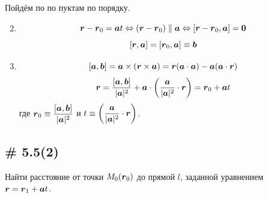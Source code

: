 \documentclass[a4paper,12pt]{article}
\begin{document}
  \begin{solution}
    Пойдём по по пуктам по порядку.
    
    \begin{enumerate}
      \setcounter{enumi}{1}
      
      \item
        \[
          \boldsymbol r - \boldsymbol r_0 = \boldsymbol a t
          \Leftrightarrow (\boldsymbol r - \boldsymbol r_0) \parallel \boldsymbol a
          \Leftrightarrow [\boldsymbol r - \boldsymbol r_0, \boldsymbol a] = \boldsymbol 0
        \]
        \[
          [\boldsymbol r, \boldsymbol a] = [\boldsymbol r_0, \boldsymbol a] \equiv \boldsymbol b
        \]
      
      \item
        \[
          [\boldsymbol a, \boldsymbol b] = \boldsymbol a \times (\boldsymbol r \times \boldsymbol a) = \boldsymbol r (\boldsymbol a \cdot \boldsymbol a) - \boldsymbol a (\boldsymbol a \cdot \boldsymbol r)
        \]
        \[
          \boldsymbol r = \frac{[\boldsymbol a, \boldsymbol b]}{|\boldsymbol a|^2} + \boldsymbol a \cdot \left(\frac{\boldsymbol a}{|\boldsymbol a|^2} \cdot \boldsymbol r\right)
          = \boldsymbol r_0 + \boldsymbol a t
        \]
        где $\bds r_0 \hm\equiv \dfrac{[\bds a, \bds b]}{|\bds a|^2}$ и $t \hm\equiv \left(\dfrac{\bds a}{|\bds a|^2} \cdot \bds r\right)$.
    \end{enumerate}
  \end{solution}
  
  
  \subsection{\# 5.5(2)}
  
  \begin{problem}
    Найти расстояние от точки $M_0(\boldsymbol r_0)$ до прямой $l$, заданной уравнением $\bds r \hm= \bds r_1 \hm+ \bds a t$.
  \end{problem}
  
\end{document}
